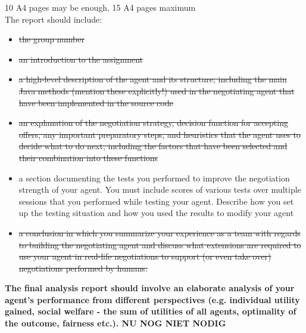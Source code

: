 \documentclass[11pt,a4paper]{article}
\begin{document}
10 A4 pages may be enough, 15 A4 pages maximum\\
The report should include:\\
\begin{itemize}
\item \st{the group number}
\item \st{an introduction to the assignment}
\item \st{a high-level description of the agent and its structure, including the main Java methods (mention
these explicitly!) used in the negotiating agent that have been implemented in the source code}
\item \st{an explanation of the negotiation strategy, decision function for accepting offers, any important
preparatory steps, and heuristics that the agent uses to decide what to do next, including the factors
that have been selected and their combination into these functions}
\item a section documenting the tests you performed to improve the negotiation strength of your agent.
You must include scores of various tests over multiple sessions that you performed while testing
your agent. Describe how you set up the testing situation and how you used the results to modify
your agent
\item \st{a conclusion in which you summarize your experience as a team with regards to building the
negotiating agent and discuss what extensions are required to use your agent in real-life negotiations
to support (or even take over) negotiations performed by humans.}
\end{itemize}

\textbf{The final analysis report should involve an elaborate analysis of your agent's performance from different perspectives (e.g. individual utility gained, social welfare - the sum of utilities of all agents, optimality of the outcome, fairness etc.). NU NOG NIET NODIG}
\end{document}
